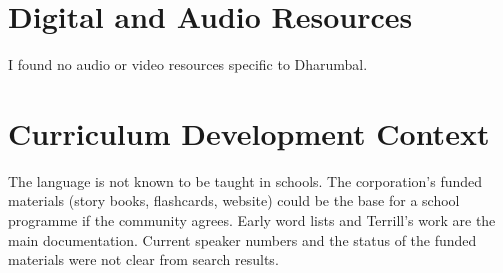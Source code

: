 \documentclass[12pt]{article}
\begin{document}
\section{Digital and Audio Resources}
I found no audio or video resources specific to Dharumbal.

\section{Curriculum Development Context}
The language is not known to be taught in schools. The corporation's funded materials (story books, flashcards, website) could be the base for a school programme if the community agrees. Early word lists and Terrill's work are the main documentation. Current speaker numbers and the status of the funded materials were not clear from search results.
\end{document}
